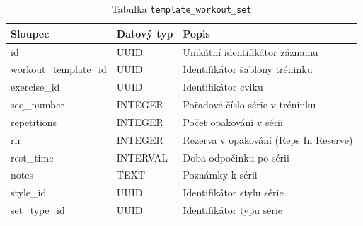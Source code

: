 \begin{table}[ht!]
    \centering
    \begin{tabularx}{\textwidth}{|l|l|L|}
        \hline
        \textbf{Sloupec}      & \textbf{Datový typ} & \textbf{Popis}                        \\ \hline
        id                    & UUID                & Unikátní identifikátor záznamu        \\ \hline
        workout\_template\_id & UUID                & Identifikátor šablony tréninku        \\ \hline
        exercise\_id          & UUID                & Identifikátor cviku                   \\ \hline
        seq\_number           & INTEGER             & Pořadové číslo série v tréninku       \\ \hline
        repetitions           & INTEGER             & Počet opakování v sérii               \\ \hline
        rir                   & INTEGER             & Rezerva v opakování (Reps In Reserve) \\ \hline
        rest\_time            & INTERVAL            & Doba odpočinku po sérii               \\ \hline
        notes                 & TEXT                & Poznámky k sérii                      \\ \hline
        style\_id             & UUID                & Identifikátor stylu série             \\ \hline
        set\_type\_id         & UUID                & Identifikátor typu série              \\ \hline
    \end{tabularx}
    \caption{Tabulka \texttt{template\_workout\_set}}
    \label{tab:template_workout_set}
\end{table}
